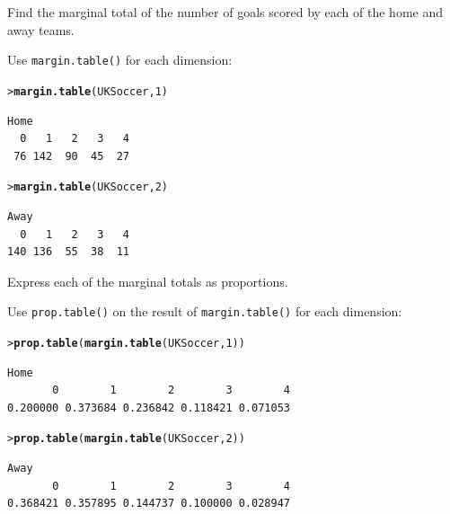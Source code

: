 \documentclass[11pt]{report}\usepackage[]{graphicx}\usepackage[]{color}
\makeatletter
\newcommand{\hlnum}[1]{\textcolor[rgb]{0.686,0.059,0.569}{#1}}%
\newcommand{\hlstd}[1]{\textcolor[rgb]{0.345,0.345,0.345}{#1}}%
\newcommand{\hlkwd}[1]{\textcolor[rgb]{0.737,0.353,0.396}{\textbf{#1}}}%
\newenvironment{kframe}{%
 \def\at@end@of@kframe{}%
 \ifinner\ifhmode%
  \def\at@end@of@kframe{\end{minipage}}%
  \begin{minipage}{\columnwidth}%
 \fi\fi%
 \def\FrameCommand##1{\hskip\@totalleftmargin \hskip-\fboxsep
 \colorbox{shadecolor}{##1}\hskip-\fboxsep
     \hskip-\linewidth \hskip-\@totalleftmargin \hskip\columnwidth}%
 \MakeFramed {\advance\hsize-\width
   \@totalleftmargin\z@ \linewidth\hsize
   \@setminipage}}%
 {\par\unskip\endMakeFramed%
 \at@end@of@kframe}
\newenvironment{knitrout}{}{} %
\renewenvironment{knitrout}{\small\renewcommand{\baselinestretch}{.85}}{} %
\makeatother
\begin{document}
\begin{Exercises}
\begin{enumerate*}
    \item Find the marginal total of the number of goals scored by each of
    the home and away teams.
    \begin{ans}
      Use \texttt{margin.table()} for each dimension:
\begin{knitrout}
\color{fgcolor}\begin{kframe}
\begin{alltt}
\hlstd{> }\hlkwd{margin.table}\hlstd{(UKSoccer,} \hlnum{1}\hlstd{)}
\end{alltt}
\begin{verbatim}
Home
  0   1   2   3   4 
 76 142  90  45  27 
\end{verbatim}
\begin{alltt}
\hlstd{> }\hlkwd{margin.table}\hlstd{(UKSoccer,} \hlnum{2}\hlstd{)}
\end{alltt}
\begin{verbatim}
Away
  0   1   2   3   4 
140 136  55  38  11 
\end{verbatim}
\end{kframe}
\end{knitrout}
    \end{ans}
    
    \item Express each of the marginal totals as proportions.
    \begin{ans}
      Use \texttt{prop.table()} on the result of \texttt{margin.table()} for each dimension:
\begin{knitrout}
\color{fgcolor}\begin{kframe}
\begin{alltt}
\hlstd{> }\hlkwd{prop.table}\hlstd{(}\hlkwd{margin.table}\hlstd{(UKSoccer,} \hlnum{1}\hlstd{))}
\end{alltt}
\begin{verbatim}
Home
       0        1        2        3        4 
0.200000 0.373684 0.236842 0.118421 0.071053 
\end{verbatim}
\begin{alltt}
\hlstd{> }\hlkwd{prop.table}\hlstd{(}\hlkwd{margin.table}\hlstd{(UKSoccer,} \hlnum{2}\hlstd{))}
\end{alltt}
\begin{verbatim}
Away
       0        1        2        3        4 
0.368421 0.357895 0.144737 0.100000 0.028947 
\end{verbatim}
\end{kframe}
\end{knitrout}
    \end{ans}
    

\end{enumerate*}
\end{Exercises}
\end{document}
